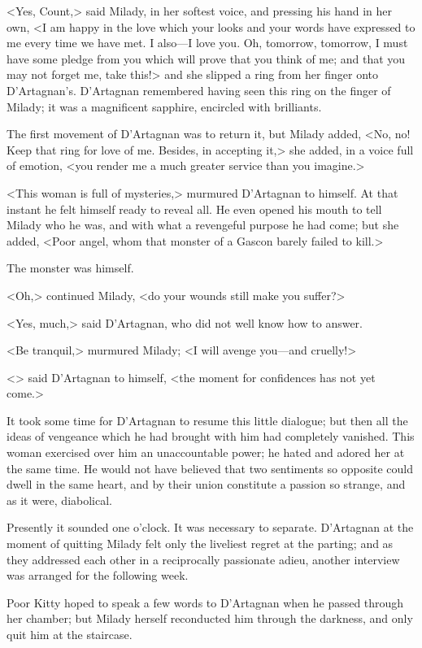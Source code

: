 <Yes, Count,> said Milady, in her softest voice, and pressing his hand in her own, <I am happy in the love which your looks and your words have expressed to me every time we have met. I also—I love you. Oh, tomorrow, tomorrow, I must have some pledge from you which will prove that you think of me; and that you may not forget me, take this!> and she slipped a ring from her finger onto D'Artagnan's. D'Artagnan remembered having seen this ring on the finger of Milady; it was a magnificent sapphire, encircled with brilliants. 

The first movement of D'Artagnan was to return it, but Milady added, <No, no! Keep that ring for love of me. Besides, in accepting it,> she added, in a voice full of emotion, <you render me a much greater service than you imagine.> 

<This woman is full of mysteries,> murmured D'Artagnan to himself. At that instant he felt himself ready to reveal all. He even opened his mouth to tell Milady who he was, and with what a revengeful purpose he had come; but she added, <Poor angel, whom that monster of a Gascon barely failed to kill.> 

The monster was himself. 

<Oh,> continued Milady, <do your wounds still make you suffer?> 

<Yes, much,> said D'Artagnan, who did not well know how to answer. 

<Be tranquil,> murmured Milady; <I will avenge you—and cruelly!> 

<> said D'Artagnan to himself, <the moment for confidences has not yet come.> 

It took some time for D'Artagnan to resume this little dialogue; but then all the ideas of vengeance which he had brought with him had completely vanished. This woman exercised over him an unaccountable power; he hated and adored her at the same time. He would not have believed that two sentiments so opposite could dwell in the same heart, and by their union constitute a passion so strange, and as it were, diabolical. 

Presently it sounded one o'clock. It was necessary to separate. D'Artagnan at the moment of quitting Milady felt only the liveliest regret at the parting; and as they addressed each other in a reciprocally passionate adieu, another interview was arranged for the following week. 

Poor Kitty hoped to speak a few words to D'Artagnan when he passed through her chamber; but Milady herself reconducted him through the darkness, and only quit him at the staircase. 

